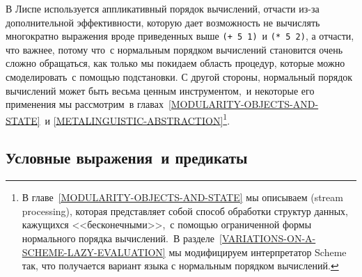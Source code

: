 В
Лиспе используется 
аппликативный порядок вычислений, 
отчасти из-за дополнительной эффективности, которую дает возможность
не вычислять многократно выражения вроде приведенных 
выше {\tt (+ 5 1)}~и {\tt (* 5 2)}, а
отчасти, что важнее, потому что~с нормальным порядком вычислений
становится очень сложно обращаться, как только мы покидаем область
процедур, которые можно смоделировать~с помощью подстановки. С другой 
стороны, нормальный порядок вычислений может быть весьма ценным
инструментом,~и некоторые его применения мы рассмотрим~в главах~\ref{MODULARITY-OBJECTS-AND-STATE}~и \ref{METALINGUISTIC-ABSTRACTION}\footnote{В главе~\ref{MODULARITY-OBJECTS-AND-STATE} мы описываем
 (stream processing),
 которая представляет собой
способ обработки структур данных, кажущихся <<бесконечными>>,~с 
помощью ограниченной формы нормального порядка вычислений.~В 
разделе~\ref{VARIATIONS-ON-A-SCHEME-LAZY-EVALUATION} мы
модифицируем интерпретатор Scheme так, что получается вариант языка с
нормальным порядком вычислений.
}.

\subsection{Условные выражения~и предикаты}
\label{CONDITIONAL-EXPRESSIONS-AND-PREDICATES}



